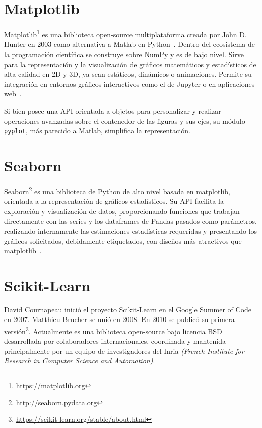 \documentclass[a4paper, 12pt]{book}
\begin{document}
\section{Matplotlib} 
\label{sec:matplotlib}

Matplotlib\footnote{\url{https://matplotlib.org}} es una biblioteca open-source multiplataforma creada por John D. Hunter en 2003 como alternativa a Matlab en Python~\cite{Hunter2007}. Dentro del ecosistema de la programación científica se construye sobre NumPy y es de bajo nivel.
Sirve para la representación y la visualización de gráficos matemáticos y estadísticos de alta calidad en 2D y 3D, ya sean estáticos, dinámicos o animaciones. Permite su integración en entornos gráficos interactivos como el de Jupyter o en aplicaciones web~\cite{VanderplasJake2017Pdsh}.

Si bien posee una API orientada a objetos para personalizar y realizar operaciones avanzadas sobre el contenedor de las figuras y sus ejes, su módulo \texttt{pyplot}, más parecido a Matlab, simplifica la representación. 

\section{Seaborn} 
\label{sec:seaborn}

Seaborn\footnote{\url{http://seaborn.pydata.org}} es una biblioteca de Python de alto nivel basada en matplotlib, orientada a la representación de gráficos estadísticos. Su API facilita la exploración y visualización de datos, proporcionando funciones que trabajan directamente con las series y los dataframes de Pandas pasados como parámetros, realizando internamente las estimaciones estadísticas requeridas y presentando los gráficos solicitados, debidamente etiquetados, con diseños más atractivos que matplotlib~\cite{waskom2021seaborn}.

\section{Scikit-Learn} 
\label{sec:sklearn}

David Cournapeau inició el proyecto Scikit-Learn en el Google Summer of Code en 2007. Matthieu Brucher se unió en 2008. En 2010 se publicó su primera versión\footnote{\url{https://scikit-learn.org/stable/about.html}}. Actualmente es una biblioteca open-source bajo licencia BSD desarrollada por colaboradores internacionales, coordinada y mantenida principalmente por un equipo de investigadores del Inria \emph{(French Institute for Research in Computer Science and Automation)}.
\end{document}
